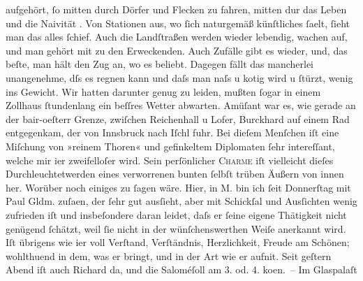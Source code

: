 \begin{ledgroupsized}[t]{13cm}
               aufgehört, ſo mitten durch Dörfer und Flecken zu fahren, mitten dur das Leben und die Naivität \damage{\textcolor{gray}{eines Ortes}}. Von Stationen aus, wo ſich naturgemäß künſtliches ſa{\geminationm}elt, ſieht man das alles ſchief. Auch die Landſtraßen
               werden wieder lebendig, wachen auf, und man gehört mit zu den Erweckenden. Auch
               Zufälle gibt es wieder, und, das beſte, man hält den Zug an, wo es beliebt. {\pb}Dagegen fällt das mancherlei unangenehme, dſs es regnen
               kann und daſs man naſs u kotig wird u ſtürzt, wenig ins Gewicht. Wir hatten darunter
               genug zu leiden, mußten ſogar in einem Zollhaus ſtundenlang ein beſſres Wetter
               abwarten. Amüſant war es, wie gerade an der bair-oeſterr Grenze, zwiſchen Reichenhall u Lofer, Burckhard auf einem Rad
               entgegenkam, der von Innsbruck nach Iſchl fuhr. Bei dieſem Menſchen iſt eine Miſchung
               von »reinem Thoren« und gefinkeltem Diplomaten ſehr intereſſant, welche mir i{\geminationm}er zweifelloſer {\pb}wird. Sein
               perſönlicher \textsc{Charme} iſt vielleicht dieſes
               Durchleuchtetwerden eines verworrenen bunten ſelbſt trüben Äußern von innen her.\pend
           \pstart
           Worüber noch einiges zu ſagen wäre. Hier, in M.
               bin ich ſeit Donnerſtag mit Paul
                  Gldm. zuſa{\geminationm}en, der ſehr gut ausſieht, aber mit
               Schickſal und Ausſichten wenig zufrieden iſt und insbeſondere daran leidet, daſs er
               ſeine eigene Thätigkeit nicht genügend ſchätzt, weil ſie nicht in der
               wünſchenswerthen Weiſe anerkannt wird. Iſt übrigens wie i{\geminationm}er voll Verſtand, Verſtändnis, Herzlichkeit, Freude am Schönen; wohlthuend in dem,
               was er bringt, und in {\pb}der Art wie er aufni{\geminationm}t. Seit geſtern Abend iſt auch Richard da, und die Saloméſoll am 3. od. 4. ko{\geminationm}en. – Im Glaspalaſt

\end{ledgroupsized}
